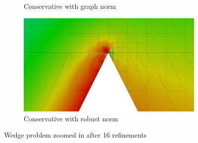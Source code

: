 \documentclass[letterpaper]{article}
\begin{document}
\begin{figure}
\begin{subfigure}[t]{0.45\textwidth}
\caption{Conservative with graph norm}
\label{fig:wedgeGraph16c_zoom}
\end{subfigure}
\begin{subfigure}[t]{0.45\textwidth}
\centering
\includegraphics[width=\textwidth]{figs/Wedge/robust16c_zoom.png}
\caption{Conservative with robust norm}
\label{fig:wedgeRobust16c_zoom}
\end{subfigure}
\caption{Wedge problem zoomed in after 16 refinements}
\label{fig:wedge_zoom}
\end{figure}
\end{document}
